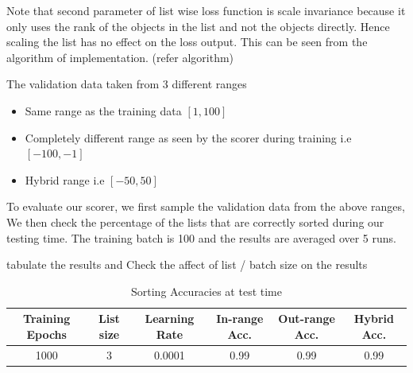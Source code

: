 \documentclass[11pt]{report}
\begin{document}
Note that second parameter of list wise loss function is scale invariance because it only uses the rank of the 
objects in the list and not the objects directly.
Hence scaling the list has no effect on the loss output.
This can be seen from the algorithm of implementation.  (refer algorithm)


The validation data taken from 3 different ranges
\begin{itemize}
\item Same range as the training data $[1, 100]$
\item Completely different range as seen by the scorer during training i.e $[-100, -1]$
\item Hybrid range i.e $[-50, 50]$
\end{itemize} 

To evaluate our scorer,  we first sample the validation data from the above ranges,
We then check the percentage of the lists that are correctly sorted during our testing time.
The training batch is 100 and the results are averaged over 5 runs.

tabulate the results and Check the affect of list / batch size on the results

\begin{table} [h!]
\centering
\resizebox{\linewidth}{!} {
\begin{tabular}{ | c | c | c | c | c | c | }
\hline
\textbf{Training Epochs} & \textbf{List size} & \textbf{Learning Rate} & \textbf{In-range Acc.} & \textbf{Out-range Acc.} & \textbf{Hybrid Acc.} \\ [0.5 ex]
\hline \hline
1000 & 3 & 0.0001 & 0.99 & 0.99 & 0.99\\
\hline
\end{tabular}
}
\caption{Sorting Accuracies at test time}
\label {table:1}
\end{table}
\end{document}
